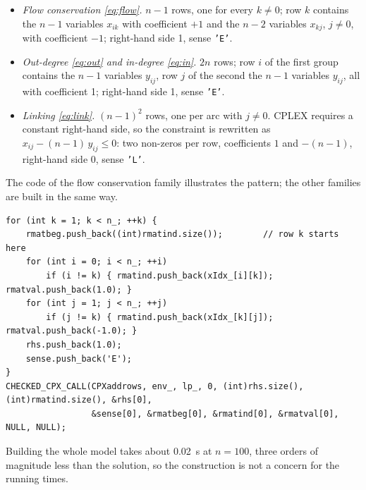 \documentclass[11pt,a4paper]{article}
\begin{document}
\begin{itemize}
  \item \emph{Flow conservation \eqref{eq:flow}.} $n-1$ rows, one for every $k\neq0$; row
    $k$ contains the $n-1$ variables $x_{ik}$ with coefficient $+1$ and the $n-2$ variables
    $x_{kj}$, $j\neq0$, with coefficient $-1$; right-hand side 1, sense \texttt{'E'}.
  \item \emph{Out-degree \eqref{eq:out} and in-degree \eqref{eq:in}.} $2n$ rows; row $i$
    of the first group contains the $n-1$ variables $y_{ij}$, row $j$ of the second the $n-1$
    variables $y_{ij}$, all with coefficient 1; right-hand side 1, sense \texttt{'E'}.
  \item \emph{Linking \eqref{eq:link}.} $(n-1)^2$ rows, one per arc with $j\neq0$. CPLEX
    requires a constant right-hand side, so the constraint is rewritten as
    $x_{ij}-(n-1)\,y_{ij}\le0$: two non-zeros per row, coefficients $1$ and $-(n-1)$,
    right-hand side 0, sense \texttt{'L'}.
\end{itemize}
The code of the flow conservation family illustrates the pattern; the other families are
built in the same way.
\begin{lstlisting}
for (int k = 1; k < n_; ++k) {
    rmatbeg.push_back((int)rmatind.size());        // row k starts here
    for (int i = 0; i < n_; ++i)
        if (i != k) { rmatind.push_back(xIdx_[i][k]); rmatval.push_back(1.0); }
    for (int j = 1; j < n_; ++j)
        if (j != k) { rmatind.push_back(xIdx_[k][j]); rmatval.push_back(-1.0); }
    rhs.push_back(1.0);
    sense.push_back('E');
}
CHECKED_CPX_CALL(CPXaddrows, env_, lp_, 0, (int)rhs.size(), (int)rmatind.size(), &rhs[0],
                 &sense[0], &rmatbeg[0], &rmatind[0], &rmatval[0], NULL, NULL);
\end{lstlisting}
Building the whole model takes about 0.02~s at $n=100$, three orders of magnitude less than
the solution, so the construction is not a concern for the running times.
\end{document}
